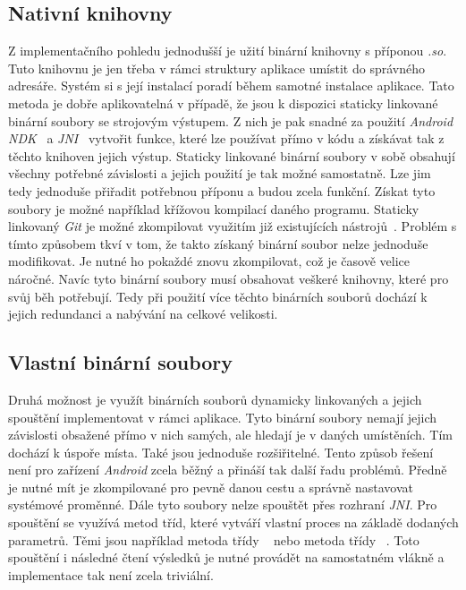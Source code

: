     \subsection{Nativní knihovny}
    Z implementačního pohledu jednodušší je užití binární knihovny s příponou \emph{.so}. Tuto knihovnu je jen třeba v rámci struktury aplikace umístit do správného adresáře. Systém si s její instalací poradí během samotné instalace aplikace. Tato metoda je dobře aplikovatelná v případě, že jsou k dispozici staticky linkované binární soubory se strojovým výstupem. Z nich je pak snadné za použití \emph{Android NDK}~ a \emph{JNI}~ vytvořit funkce, které lze používat přímo v kódu a získávat tak z těchto knihoven jejich výstup. Staticky linkované binární soubory v sobě obsahují všechny potřebné závislosti a jejich použití je tak možné samostatně. Lze jim tedy jednoduše přiřadit potřebnou příponu a budou zcela funkční. Získat tyto soubory je možné například křížovou kompilací daného programu. Staticky linkovaný \emph{Git} je možné zkompilovat využitím již existujících nástrojů~. Problém s tímto způsobem tkví v tom, že takto získaný binární soubor nelze jednoduše modifikovat. Je nutné ho pokaždé znovu zkompilovat, což je časově velice náročné. Navíc tyto binární soubory musí obsahovat veškeré knihovny, které pro svůj běh potřebují. Tedy při použití více těchto binárních souborů dochází k jejich redundanci a nabývání na celkové velikosti.

    \newpage
    \subsection{Vlastní binární soubory}\label{subsec:dyn_binaries}
    Druhá možnost je využít binárních souborů dynamicky linkovaných a jejich spouštění implementovat v rámci aplikace. Tyto binární soubory nemají jejich závislosti obsažené přímo v nich samých, ale hledají je v daných umístěních. Tím dochází k úspoře místa. Také jsou jednoduše rozšiřitelné. Tento způsob řešení není pro zařízení \emph{Android} zcela běžný a přináší tak další řadu problémů. Předně je nutné mít je zkompilované pro pevně danou cestu a správně nastavovat systémové proměnné. Dále tyto soubory nelze spouštět přes rozhraní \emph{JNI}. Pro spouštění se využívá metod tříd, které vytváří vlastní proces na základě dodaných parametrů. Těmi jsou například metoda  třídy ~ nebo metoda  třídy ~. Toto spouštění i následné čtení výsledků je nutné provádět na samostatném vlákně a implementace tak není zcela triviální.


